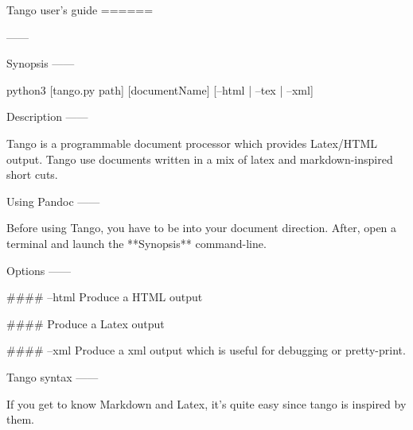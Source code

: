 Tango user's guide
======


------


Synopsis
------

python3 [tango.py path] [documentName] [--html | --tex | --xml]


Description
------

Tango is a programmable document processor which provides Latex/HTML output.
Tango use documents written in a mix of latex and markdown-inspired short cuts.


Using Pandoc
------

Before using Tango, you have to be into your document direction.
After, open a terminal and launch the **Synopsis** command-line.

Options
------

#### --html
Produce a HTML output

####
Produce a Latex output

#### --xml
Produce a xml output which is useful for debugging or pretty-print.




Tango syntax
------

If you get to know Markdown and Latex, it's quite easy since tango is inspired by them.


